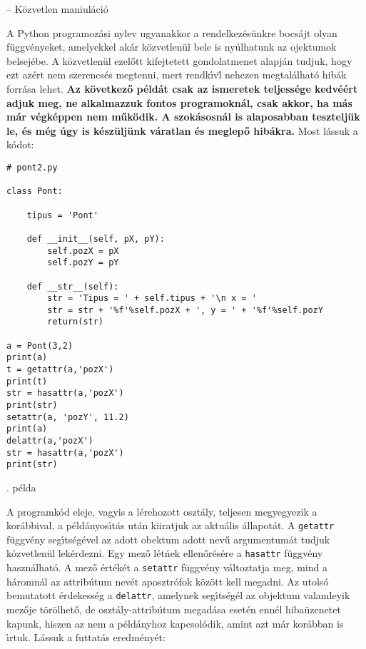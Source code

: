 -- K\"ozvetlen maniul\'aci\'o

A Python programoz\'asi nylev ugyanakkor a rendelkez\'es\"unkre bocs\'ajt olyan f\"uggv\'enyeket, 
amelyekkel ak\'ar k\"ozvetlen\"ul bele is ny\'ulhatunk az ojektumok belsej\'ebe. A k\"ozvetlen\"ul 
ezel\H{o}tt kifejtetett gondolatmenet alapj\'an tudjuk, hogy ezt az\'ert nem szerencs\'es megtenni, 
mert rendk\'{\i}v\"l nehezen megtal\'alhat\'o hib\'ak forr\'asa lehet. {\bf Az k\"ovetkez\H{o} p\'eld\'at 
csak az ismeretek teljess\'ege kedv\'e\'ert adjuk meg, ne alkalmazzuk fontos programokn\'al, csak akkor, 
ha m\'as m\'ar v\'egk\'eppen nem m\H{u}k\"odik. A szok\'asosn\'al is alaposabban tesztelj\"uk le, \'es 
m\'eg \'ugy is k\'esz\"ulj\"unk v\'aratlan \'es meglep\H{o} hib\'akra.} Most l\'assuk a k\'odot:

\incminta
\begin{Verbatim}[fontsize=\small]
# pont2.py

class Pont:

    tipus = 'Pont'

    def __init__(self, pX, pY):
        self.pozX = pX
        self.pozY = pY

    def __str__(self):
        str = 'Tipus = ' + self.tipus + '\n x = ' 
        str = str + '%f'%self.pozX + ', y = ' + '%f'%self.pozY
        return(str)

a = Pont(3,2)
print(a)
t = getattr(a,'pozX')
print(t)
str = hasattr(a,'pozX')
print(str)
setattr(a, 'pozY', 11.2)
print(a)
delattr(a,'pozX')
str = hasattr(a,'pozX')
print(str)
\end{Verbatim}
\theminta. p\'elda

\noindent A programk\'od eleje, vagyis a l\'erehozott oszt\'aly, teljesen megyegyezik a kor\'abbi\-val, 
a p\'eld\'anyos\'{\i}t\'as ut\'an kiiratjuk az aktu\'alis \'allapot\'at. A {\tt getattr} f\"uggv\'eny 
seg\'{\i}ts\'eg\'evel az adott obektum adott nev\H{u} argumentum\'at tudjuk k\"ozvetlen\"ul lek\'erdezni. 
Egy mez\H{o} l\'et\'nek ellen\H{o}r\'es\'ere a {\tt hasattr} f\"uggv\'eny haszn\'alhat\'o. A mez\H{o} 
\'ert\'ek\'et a {\tt setattr} f\"uggv\'eny v\'altoztatja meg, mind a h\'aromn\'al az attrib\'utum nev\'et 
aposztr\'ofok k\"oz\"ott kell megadni. Az utols\'o bemutatott \'erdekess\'eg a {\tt delattr}, amelynek 
seg\'{\i}ts\'eg\'el az objektum valamleyik mez\H{o}je t\"or\"olhet\H{o}, de oszt\'aly-attrib\'utum 
megad\'asa eset\'en enn\'el hiba\"uzenetet kapunk, hiszen az nem a p\'eld\'anyhoz kapcsol\'odik, 
amint azt m\'ar kor\'abban is \'{\i}rtuk. L\'assuk a futtat\'as eredm\'eny\'et:

